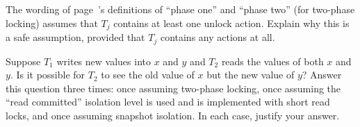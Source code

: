 \begin{chapterEnumerate}
\item
The wording of page~\pageref{phase-one-definition}'s definitions of ``phase one'' and ``phase two'' (for two-phase locking) assumes that $T_j$ contains at least one unlock action.  Explain why this is a safe assumption, provided that $T_j$ contains any actions at all.
\item
Suppose $T_1$ writes new values into $x$ and $y$ and $T_2$ reads the values of both $x$ and $y$.  Is it possible for $T_2$ to see the old value of $x$ but the new value of $y$?  Answer this question three times: once assuming two-phase locking, once assuming the ``read committed'' isolation level is used and is implemented with short read locks, and once assuming snapshot isolation.  In each case, justify your answer.
\end{chapterEnumerate}

